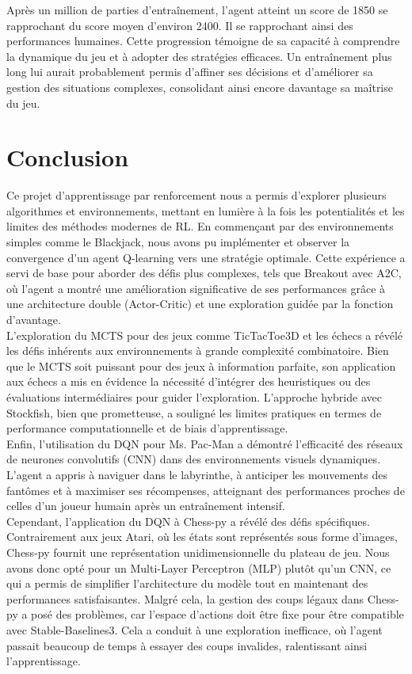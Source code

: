 \documentclass{article}
\begin{document}
Après un million de parties d’entraînement, l’agent atteint un score de 1850 se rapprochant du score moyen d’environ 2400. Il se rapprochant ainsi des performances humaines. Cette progression témoigne de sa capacité à comprendre la dynamique du jeu et à adopter des stratégies efficaces. Un entraînement plus long lui aurait probablement permis d’affiner ses décisions et d’améliorer sa gestion des situations complexes, consolidant ainsi encore davantage sa maîtrise du jeu.

\clearpage

\section{Conclusion}
\quad Ce projet d'apprentissage par renforcement nous a permis d'explorer plusieurs algorithmes et environnements, mettant en lumière à la fois les potentialités et les limites des méthodes modernes de RL. En commençant par des environnements simples comme le Blackjack, nous avons pu implémenter et observer la convergence d'un agent Q-learning vers une stratégie optimale. Cette expérience a servi de base pour aborder des défis plus complexes, tels que Breakout avec A2C, où l'agent a montré une amélioration significative de ses performances grâce à une architecture double (Actor-Critic) et une exploration guidée par la fonction d'avantage.\\

L'exploration du MCTS pour des jeux comme TicTacToe3D et les échecs a révélé les défis inhérents aux environnements à grande complexité combinatoire. Bien que le MCTS soit puissant pour des jeux à information parfaite, son application aux échecs a mis en évidence la nécessité d'intégrer des heuristiques ou des évaluations intermédiaires pour guider l'exploration. L'approche hybride avec Stockfish, bien que prometteuse, a souligné les limites pratiques en termes de performance computationnelle et de biais d'apprentissage.\\

Enfin, l'utilisation du DQN pour Ms. Pac-Man a démontré l'efficacité des réseaux de neurones convolutifs (CNN) dans des environnements visuels dynamiques. L'agent a appris à naviguer dans le labyrinthe, à anticiper les mouvements des fantômes et à maximiser ses récompenses, atteignant des performances proches de celles d'un joueur humain après un entraînement intensif.\\

Cependant, l'application du DQN à Chess-py a révélé des défis spécifiques. Contrairement aux jeux Atari, où les états sont représentés sous forme d'images, Chess-py fournit une représentation unidimensionnelle du plateau de jeu. Nous avons donc opté pour un Multi-Layer Perceptron (MLP) plutôt qu'un CNN, ce qui a permis de simplifier l'architecture du modèle tout en maintenant des performances satisfaisantes. Malgré cela, la gestion des coups légaux dans Chess-py a posé des problèmes, car l'espace d'actions doit être fixe pour être compatible avec Stable-Baselines3. Cela a conduit à une exploration inefficace, où l'agent passait beaucoup de temps à essayer des coups invalides, ralentissant ainsi l'apprentissage.\\
\end{document}

